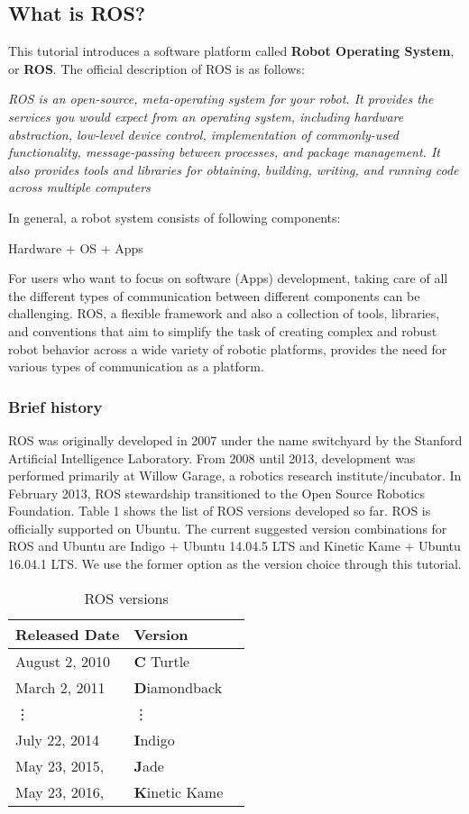 \subsection{What is ROS?}
This tutorial introduces a software platform
called \textbf{Robot Operating System}, or \textbf{ROS}. The official description of ROS is as follows:
\begin{displayquote}
\textit{ROS is an open-source, meta-operating system for your robot. It provides the
services you would expect from an operating system, including hardware abstraction,
low-level device control, implementation of commonly-used functionality,
message-passing between processes, and package management. It
also provides tools and libraries for obtaining, building, writing, and running
code across multiple computers}
\end{displayquote}
In general, a robot system consists of following components:
\begin{displayquote}
\begin{center}
Hardware + OS + Apps
\end{center}
\end{displayquote}
For users who want to focus on software (Apps) development, taking care of all the different types of communication between different components can be challenging. ROS, a flexible framework and also a collection of tools, libraries, and conventions that aim to simplify the task of creating complex and robust robot behavior across a wide variety of robotic platforms, provides the need for various types of communication as a platform.
\subsubsection{Brief history}
ROS was originally developed in 2007 under the name switchyard by the Stanford Artificial Intelligence Laboratory. From 2008 until 2013, development was performed primarily at Willow Garage, a robotics research institute/incubator. In February 2013, ROS stewardship transitioned to the Open Source Robotics Foundation. Table 1 shows the list of ROS versions developed so far. ROS is officially supported on Ubuntu. The current suggested version combinations for ROS and Ubuntu are Indigo $+$ Ubuntu 14.04.5 LTS and Kinetic Kame $+$ Ubuntu 16.04.1 LTS. We use the former option as the version choice through this tutorial.
\begin{table}
\caption{ROS versions}
\begin{center}
\begin{tabular}{llr} 
\toprule
\cmidrule(r){1-2}
Released Date    & Version \\
\midrule
August 2, 2010      & \textbf{C} Turtle    \\
March 2, 2011          &    \textbf{D}iamondback     \\
\vdots       & \vdots    \\
July 22, 2014 & \textbf{I}ndigo      \\
May 23, 2015,& \textbf{J}ade      \\
May 23, 2016,& \textbf{K}inetic Kame      \\
\bottomrule
\end{tabular}
\end{center}
\end{table}
